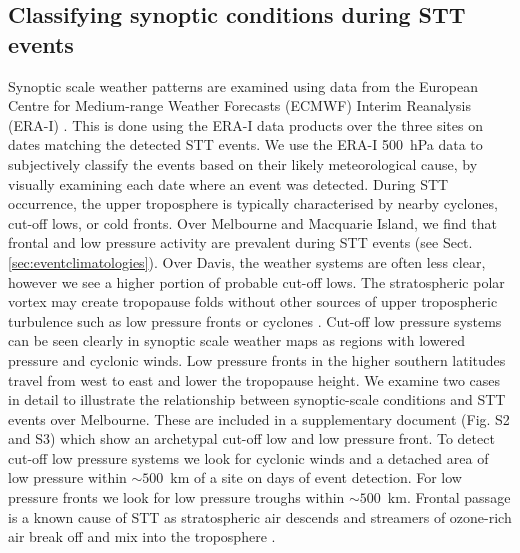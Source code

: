 \documentclass[acp, manuscript]{copernicus} %
\begin{document}
  \subsection{Classifying synoptic conditions during STT events}
  \label{sec:WeatherClassifications}
    Synoptic scale weather patterns are examined using data from the European Centre for Medium-range Weather Forecasts (ECMWF) Interim Reanalysis (ERA-I) \citep{Dee2011}.
    This is done using the ERA-I data products over the three sites on dates matching the detected STT events.
    We use the ERA-I 500~hPa data to subjectively classify the events based on their likely meteorological cause, by visually examining each date where an event was detected.
    During STT occurrence, the upper troposphere is typically characterised by nearby cyclones, cut-off lows, or cold fronts.
    Over Melbourne and Macquarie Island, we find that frontal and low pressure activity are prevalent during STT events (see Sect. \ref{sec:eventclimatologies}).
    Over Davis, the weather systems are often less clear, however we see a higher portion of probable cut-off lows. 
    The stratospheric polar vortex may create tropopause folds without other sources of upper tropospheric turbulence such as low pressure fronts or cyclones \citep[e.g.][]{Baray2000,Sprenger2003,Tyrlis2014}.
    Cut-off low pressure systems can be seen clearly in synoptic scale weather maps as regions with lowered pressure and cyclonic winds.
    Low pressure fronts in the higher southern latitudes travel from west to east and lower the tropopause height.
    We examine two cases in detail to illustrate the relationship between synoptic-scale conditions and STT events over Melbourne.
    These are included in a supplementary document (Fig. S2 and S3) which show an archetypal cut-off low and low pressure front.
    To detect cut-off low pressure systems we look for cyclonic winds and a detached area of low pressure within $\sim 500$~km of a site on days of event detection.
    For low pressure fronts we look for low pressure troughs within $\sim 500$~km.
    Frontal passage is a known cause of STT as stratospheric air descends and streamers of ozone-rich air break off and mix into the troposphere \citep{Sprenger2003}.
\end{document}
